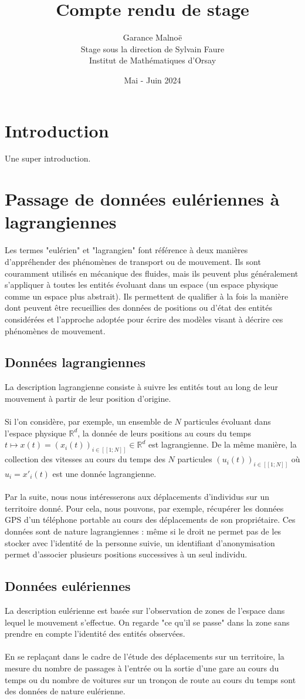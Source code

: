 \documentclass[12pt]{article}
\title{Compte rendu de stage}
\author{Garance Malnoë\\
Stage sous la direction de Sylvain Faure\\
Institut de Mathématiques d'Orsay}
\date{Mai - Juin 2024}
\newcommand{\R}{\mathbb{R}}
\newcommand{\dcrochetg}{[\![}
\newcommand{\dcrochetd}{]\!]}
\begin{document}
\maketitle
\tableofcontents
\newpage
\section{Introduction}
 Une super introduction.
\section{Passage de données eulériennes à lagrangiennes}
Les termes "eulérien" et "lagrangien" font référence à deux manières d'appréhender des phénomènes de transport ou de mouvement. Ils sont couramment utilisés en mécanique des fluides, mais ils peuvent plus généralement s'appliquer à toutes les entités évoluant dans un espace (un  espace physique comme un espace plus abstrait). Ils permettent de qualifier à la fois la manière dont peuvent être recueillies des données de positions ou d'état des entités considérées et l'approche adoptée pour écrire des modèles visant à décrire ces phénomènes de mouvement.
\subsection{Données lagrangiennes}
La description lagrangienne consiste à suivre les entités tout au long de leur mouvement à partir de leur position d'origine.\\
\\
Si l'on considère, par exemple, un ensemble de $N$ particules évoluant dans l'espace physique $\mathbb{R}^d$, la donnée de leurs positions au cours du temps $t \mapsto x(t) = (x_i(t))_{i \in \dcrochetg1;N\dcrochetd} \in \R^d $ est lagrangienne. De la même manière, la collection des vitesses au cours du temps des $N$ particules $(u_i(t))_{i \in \dcrochetg1;N\dcrochetd} $ où $u_i = x'_i(t)$ est une donnée lagrangienne.\\
\\
Par la suite, nous nous intéresserons aux déplacements d'individus sur un territoire donné. Pour cela, nous pouvons, par exemple, récupérer les données GPS d’un téléphone portable au cours des déplacements de son propriétaire. Ces données sont de nature lagrangiennes : même si le droit ne permet pas de les stocker avec l’identité de la personne suivie, un identifiant d’anonymisation permet d’associer plusieurs positions successives à un seul individu.
\subsection{Données eulériennes}
La description eulérienne est basée sur l'observation de zones de l'espace dans lequel le mouvement s'effectue. On regarde "ce qu'il se passe" dans la zone sans prendre en compte l'identité des entités observées.\\
\\
En se replaçant dans le cadre de l'étude des déplacements sur un territoire, la mesure du nombre de passages à l'entrée ou la sortie d'une gare au cours du temps ou du nombre de voitures sur un tronçon de route au cours du temps sont des données de nature eulérienne.
\end{document}
